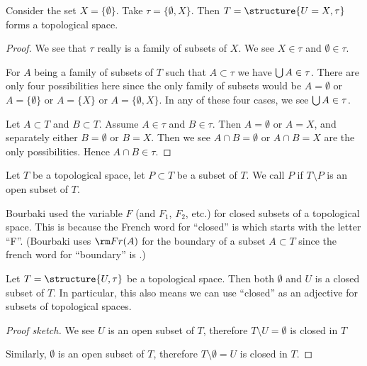 \begin{example}
Consider the set $X=\{\emptyset\}$. Take $\tau=\{\emptyset,X\}$.
Then $T=\structure{U=X,\tau}$ forms a topological space.

\begin{proof}
We see that $\tau$ really is a family of subsets of $X$.
We see $X\in\tau$ and $\emptyset\in\tau$.

For $A$ being a family of subsets of $T$ such that $A\subset\tau$ we
have $\bigcup A\in\tau$. There are only four possibilities here since
the only family of subsets would be $A=\emptyset$ or $A=\{\emptyset\}$
or $A=\{X\}$ or $A=\{\emptyset,X\}$. In any of these four cases, we
see $\bigcup A\in\tau$.

Let $A\subset T$ and $B\subset T$. Assume $A\in\tau$ and $B\in\tau$. 
Then $A=\emptyset$ or $A=X$, and separately either $B=\emptyset$ or $B=X$.
Then we see $A\cap B=\emptyset$ or $A\cap B=X$ are the only possibilities. 
Hence $A\cap B\in\tau$.
\end{proof}
\end{example}

\begin{definition}
Let $T$ be a topological space, let $P\subset T$ be a subset of $T$.
We call $P$  if $T\setminus P$ is an open subset of $T$.
\end{definition}

\begin{remark}
Bourbaki used the variable $F$ (and $F_{1}$, $F_{2}$, etc.) for closed
subsets of a topological space. This is because the French word for
``closed'' is  which starts with the letter ``F''.
(Bourbaki uses $\mathop{\rm Fr}(A)$ for the boundary of a subset
$A\subset T$ since the french word for ``boundary'' is
.) 
\end{remark}

\begin{example}
Let $T = \structure{U,\tau}$ be a topological space.
Then both $\emptyset$ and $U$ is a closed subset of $T$.
In particular, this also means we can use ``closed'' as an adjective
for subsets of topological spaces.

\begin{proof}[Proof sketch]
We see $U$ is an open subset of $T$, therefore $T\setminus U=\emptyset$
is closed in $T$

Similarly, $\emptyset$ is an open subset of $T$, therefore
$T\setminus\emptyset=U$ is closed in $T$.
\end{proof}
\end{example}

